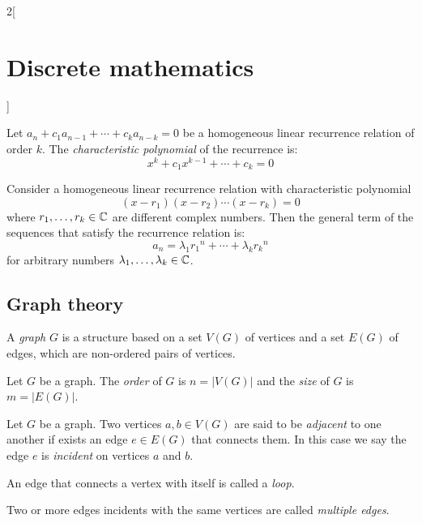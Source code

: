 \documentclass[../../../main_math.tex]{subfiles}
\begin{document}
\begin{multicols}{2}[\section{Discrete mathematics}]
  \begin{definition}
    Let $a_n+c_1a_{n-1}+\cdots+c_ka_{n-k}=0$ be a homogeneous linear recurrence relation of order $k$. The \emph{characteristic polynomial} of the recurrence is: $$x^k+c_1x^{k-1}+\cdots+c_k=0$$
  \end{definition}
  \begin{proposition}
    Consider a homogeneous linear recurrence relation with characteristic polynomial $$(x-r_1)(x-r_2)\cdots(x-r_k)=0$$ where $r_1,\ldots,r_k\in\mathbb{C} $ are different complex numbers. Then the general term of the sequences that satisfy the recurrence relation is: $$a_n=\lambda_1{r_1}^n+\cdots+\lambda_k{r_k}^n$$ for arbitrary numbers $\lambda_1,\ldots,\lambda_k\in\mathbb{C} $.
  \end{proposition}
  \subsection{Graph theory}
  \begin{definition}
    A \emph{graph} $G$ is a structure based on a set $V(G)$ of vertices and a set $E(G)$ of edges, which are non-ordered pairs of vertices.
  \end{definition}
  \begin{definition}
    Let $G$ be a graph. The \emph{order} of $G$ is $n=|V(G)|$ and the \emph{size} of $G$ is $m=|E(G)|$.
  \end{definition}
  \begin{definition}
    Let $G$ be a graph. Two vertices $a,b\in V(G)$ are said to be \emph{adjacent} to one another if exists an edge $e\in E(G)$ that connects them. In this case we say the edge $e$ is \emph{incident} on vertices $a$ and $b$.
  \end{definition}
  \begin{definition}
    An edge that connects a vertex with itself is called a \emph{loop}.
  \end{definition}
  \begin{definition}
    Two or more edges incidents with the same vertices are called \emph{multiple edges}.
  \end{definition}
  \begin{center}
    \begin{minipage}{\linewidth}
      \centering
      
    \end{minipage}
  \end{center}

\end{multicols}
\end{document}
